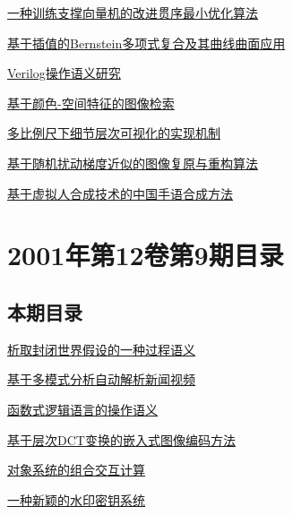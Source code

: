 \documentclass[a4paper]{article}
\begin{document}
\href{http://www.jos.org.cn/ch/reader/download_pdf.aspx?file_no=20021014&year_id=2002&quarter_id=10&falg=1}{一种训练支撑向量机的改进贯序最小优化算法}

\href{http://www.jos.org.cn/ch/reader/download_pdf.aspx?file_no=20021015&year_id=2002&quarter_id=10&falg=1}{基于插值的Bernstein多项式复合及其曲线曲面应用}

\href{http://www.jos.org.cn/ch/reader/download_pdf.aspx?file_no=20021016&year_id=2002&quarter_id=10&falg=1}{Verilog操作语义研究}

\href{http://www.jos.org.cn/ch/reader/download_pdf.aspx?file_no=20021017&year_id=2002&quarter_id=10&falg=1}{基于颜色-空间特征的图像检索}

\href{http://www.jos.org.cn/ch/reader/download_pdf.aspx?file_no=20021018&year_id=2002&quarter_id=10&falg=1}{多比例尺下细节层次可视化的实现机制}

\href{http://www.jos.org.cn/ch/reader/download_pdf.aspx?file_no=20021019&year_id=2002&quarter_id=10&falg=1}{基于随机扰动梯度近似的图像复原与重构算法}

\href{http://www.jos.org.cn/ch/reader/download_pdf.aspx?file_no=20021020&year_id=2002&quarter_id=10&falg=1}{基于虚拟人合成技术的中国手语合成方法}


\section{\textbf{2001年第12卷第9期目录}}
\subsection{本期目录}
\href{http://www.jos.org.cn/ch/reader/download_pdf.aspx?file_no=20010901&year_id=2001&quarter_id=9&falg=1}{析取封闭世界假设的一种过程语义}

\href{http://www.jos.org.cn/ch/reader/download_pdf.aspx?file_no=20010902&year_id=2001&quarter_id=9&falg=1}{基于多模式分析自动解析新闻视频}

\href{http://www.jos.org.cn/ch/reader/download_pdf.aspx?file_no=20010903&year_id=2001&quarter_id=9&falg=1}{函数式逻辑语言的操作语义}

\href{http://www.jos.org.cn/ch/reader/download_pdf.aspx?file_no=20010904&year_id=2001&quarter_id=9&falg=1}{基于层次DCT变换的嵌入式图像编码方法}

\href{http://www.jos.org.cn/ch/reader/download_pdf.aspx?file_no=20010905&year_id=2001&quarter_id=9&falg=1}{对象系统的组合交互计算}

\href{http://www.jos.org.cn/ch/reader/download_pdf.aspx?file_no=20010906&year_id=2001&quarter_id=9&falg=1}{一种新颖的水印密钥系统}
\end{document}
